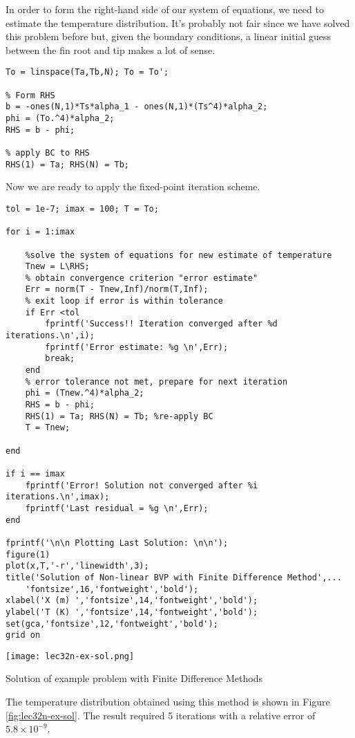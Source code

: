 In order to form the right-hand side of our system of equations, we need to estimate the temperature distribution.  It's probably not fair since we have solved this problem before but, given the boundary conditions, a linear initial guess between the fin root and tip makes a lot of sense.

\begin{lstlisting}[style=myMatlab,name=lec32n-ex]
% Estimate initial temperature distribution
To = linspace(Ta,Tb,N); To = To';

% Form RHS
b = -ones(N,1)*Ts*alpha_1 - ones(N,1)*(Ts^4)*alpha_2;
phi = (To.^4)*alpha_2;
RHS = b - phi;

% apply BC to RHS
RHS(1) = Ta; RHS(N) = Tb;

\end{lstlisting}

Now we are ready to apply the fixed-point iteration scheme.
\begin{lstlisting}[style=myMatlab,name=lec32n-ex]
tol = 1e-7; imax = 100; T = To;

for i = 1:imax

    %solve the system of equations for new estimate of temperature
    Tnew = L\RHS;     
    % obtain convergence criterion "error estimate"
    Err = norm(T - Tnew,Inf)/norm(T,Inf);    
    % exit loop if error is within tolerance
    if Err <tol
        fprintf('Success!! Iteration converged after %d iterations.\n',i);
        fprintf('Error estimate: %g \n',Err);
        break;
    end    
    % error tolerance not met, prepare for next iteration
    phi = (Tnew.^4)*alpha_2;
    RHS = b - phi;
    RHS(1) = Ta; RHS(N) = Tb; %re-apply BC   
    T = Tnew;
    
end

if i == imax
    fprintf('Error! Solution not converged after %i iterations.\n',imax);
    fprintf('Last residual = %g \n',Err);
end

fprintf('\n\n Plotting Last Solution: \n\n');
figure(1)
plot(x,T,'-r','linewidth',3);
title('Solution of Non-linear BVP with Finite Difference Method',...
    'fontsize',16,'fontweight','bold');
xlabel('X (m) ','fontsize',14,'fontweight','bold');
ylabel('T (K) ','fontsize',14,'fontweight','bold');
set(gca,'fontsize',12,'fontweight','bold');
grid on
\end{lstlisting}
\begin{marginfigure}
\texttt{[image: lec32n-ex-sol.png]}
\caption{Solution of example problem with Finite Difference Methods}
\label{fig:lec32n-ex-sol}
\end{marginfigure}
The temperature distribution obtained using this method is shown in Figure \ref{fig:lec32n-ex-sol}.  The result required 5 iterations with a relative error of $5.8\times 10^{-9}$.
